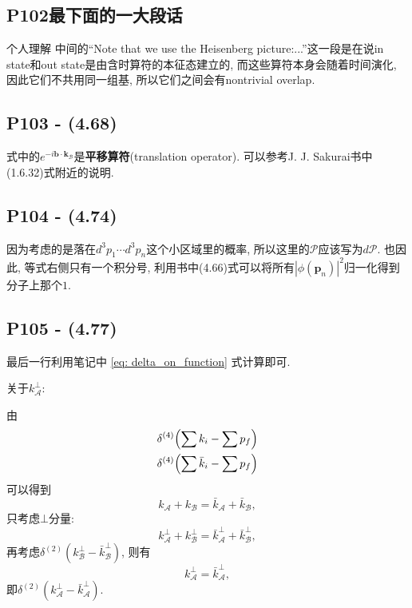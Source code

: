 \subsection{P102最下面的一大段话}

\begin{mybox}{个人理解}
  中间的“Note that we use the Heisenberg picture:...”这一段是在说in state和out state是由含时算符的本征态建立的, 而这些算符本身会随着时间演化, 因此它们不共用同一组基, 所以它们之间会有nontrivial overlap.
\end{mybox}

\subsection{P103 - (4.68)}

式中的$e^{-i\mathbf{b}\cdot\mathbf{k_{\mathcal{B}}}}$是\textbf{平移算符}(translation operator).
可以参考J. J. Sakurai书中(1.6.32)式附近的说明.

\subsection{P104 - (4.74)}

因为考虑的是落在$d^3p_1\cdots d^3p_n$这个小区域里的概率, 所以这里的$\mathcal{P}$应该写为$d\mathcal{P}$.
也因此, 等式右侧只有一个积分号, 利用书中(4.66)式可以将所有$|\phi(\mathbf{p}_n)|^2$归一化得到分子上那个$1$.

\subsection{P105 - (4.77)}

最后一行利用笔记中 \eqref{eq: delta_on_function} 式计算即可.

关于$k_{\mathcal{A}}^{\bot}$:

由
\begin{gather}
  \delta^{(4)}\Bigl(\sum k_i - \sum p_f\Bigr) \\
  \delta^{(4)}\Bigl(\sum \bar{k}_i - \sum p_f\Bigr)
\end{gather}
可以得到
\begin{equation}
  k_\mathcal{A} + k_\mathcal{B} = \bar{k}_\mathcal{A} + \bar{k}_\mathcal{B},
\end{equation}
只考虑$\bot$分量:
\begin{equation}
  k_{\mathcal{A}}^{\bot} + k_{\mathcal{B}}^{\bot} = \bar{k}_{\mathcal{A}}^{\bot} + \bar{k}_{\mathcal{B}}^{\bot},
\end{equation}
再考虑$\delta^{(2)}(k_{\mathcal{B}}^{\bot} - \bar{k}_{\mathcal{B}}^{\bot})$, 则有
\begin{equation}
  k_{\mathcal{A}}^{\bot} = \bar{k}_{\mathcal{A}}^{\bot},
\end{equation}
即$\delta^{(2)}(k_{\mathcal{A}}^{\bot} - \bar{k}_{\mathcal{A}}^{\bot})$.

